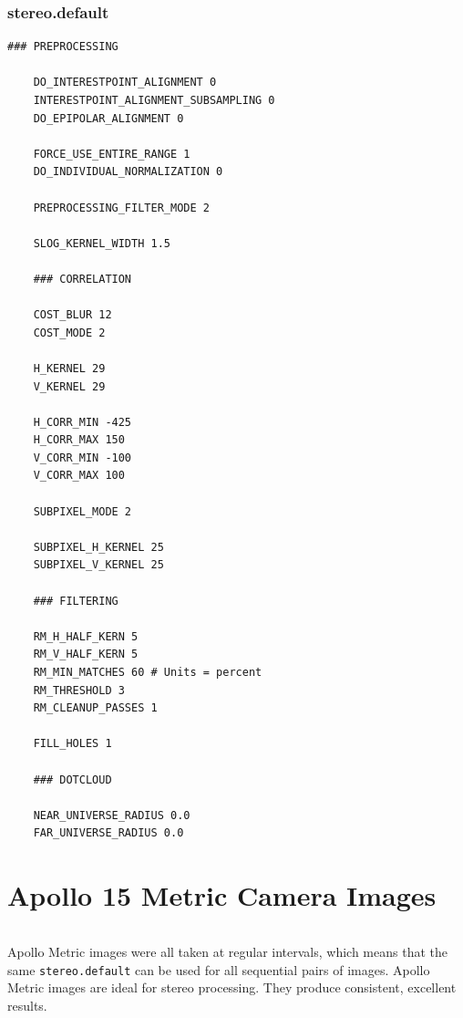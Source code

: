 \subsubsection*{stereo.default}

\begin{center}\begin{minipage}{5.5in}
\begin{Verbatim}[frame=single,fontsize=\small,label=stereo.default for LROC NAC]
    ### PREPROCESSING

    DO_INTERESTPOINT_ALIGNMENT 0
    INTERESTPOINT_ALIGNMENT_SUBSAMPLING 0
    DO_EPIPOLAR_ALIGNMENT 0

    FORCE_USE_ENTIRE_RANGE 1
    DO_INDIVIDUAL_NORMALIZATION 0

    PREPROCESSING_FILTER_MODE 2

    SLOG_KERNEL_WIDTH 1.5

    ### CORRELATION

    COST_BLUR 12
    COST_MODE 2

    H_KERNEL 29
    V_KERNEL 29

    H_CORR_MIN -425
    H_CORR_MAX 150
    V_CORR_MIN -100
    V_CORR_MAX 100

    SUBPIXEL_MODE 2

    SUBPIXEL_H_KERNEL 25
    SUBPIXEL_V_KERNEL 25

    ### FILTERING

    RM_H_HALF_KERN 5
    RM_V_HALF_KERN 5
    RM_MIN_MATCHES 60 # Units = percent
    RM_THRESHOLD 3
    RM_CLEANUP_PASSES 1

    FILL_HOLES 1

    ### DOTCLOUD

    NEAR_UNIVERSE_RADIUS 0.0
    FAR_UNIVERSE_RADIUS 0.0
\end{Verbatim}
\end{minipage}\end{center}

\section{Apollo 15 Metric Camera Images}

\begin{tabular}{ r c r c}

\end{tabular}

Apollo Metric images were all taken at regular intervals, which means
that the same \texttt{stereo.default} can be used for all sequential pairs of
images. Apollo Metric images are ideal for stereo processing.  They
produce consistent, excellent results.

